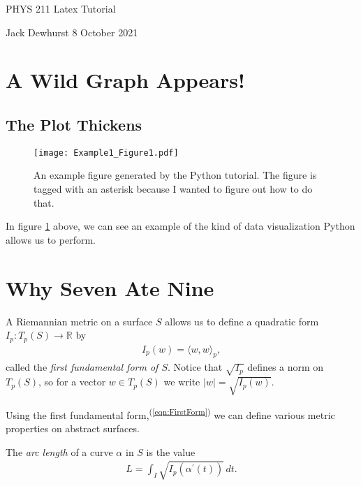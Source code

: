 \documentclass[letter]{article}
\newcommand{\IP}[1]{\langle #1 \rangle}
\begin{document}

\begin{center}
	{\large PHYS 211 Latex Tutorial}
	
	Jack Dewhurst \hspace{1cm}
	8 October 2021
	
	\vspace{5mm}
\end{center}
	

\section{A Wild Graph Appears!}

\subsection{The Plot Thickens}

\begin{figure}[h]
    \centering
    \texttt{[image: Example1\_Figure1.pdf]}
    \floattag{(\textasteriskcentered)}
    \caption{An example figure generated by the Python tutorial. The figure is tagged with an asterisk because I wanted to figure out how to do that.}
    \label{fig:ex1}
\end{figure}

In figure \ref{fig:ex1} above, we can see an example of the kind of data visualization Python allows us to perform. \lipsum[1]


\section{Why Seven Ate Nine}

    A Riemannian metric on a surface $S$ allows us to define a quadratic form $I_p : T_p(S) \to \mathbb{R}$ by
\begin{align} \label{eqn:FirstForm}
I_p (w) = \IP{w,w}_p,
\end{align}
called the \textit{first fundamental form of $S$}. Notice that $\sqrt{I_p}$ defines a norm on $T_p(S)$, so for a vector $w \in T_p(S)$ we write $|w| = \sqrt{I_p(w)}$. 

    Using the first fundamental form,\textsuperscript{(\ref{eqn:FirstForm})} we can define various metric properties on abstract surfaces. 

The \textit{arc length} of a curve $\alpha$ in $S$ is the value
\begin{align}\label{eqn:arcLength}
L = \int_I \sqrt{I_p (\alpha^\prime (t))} \, dt.
\end{align}
\end{document}
